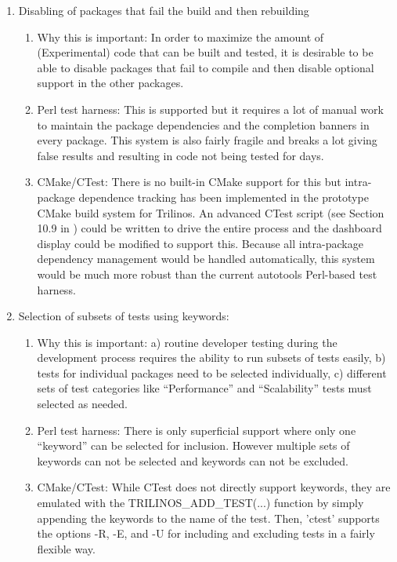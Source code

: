 \documentclass[pdf,ps2pdf,11pt]{SANDreport}
\begin{document}
\begin{enumerate}
{}\item Disabling of packages that fail the build and then rebuilding

  \begin{enumerate}

  {}\item Why this is important: In order to maximize the amount of
  (Experimental) code that can be built and tested, it is desirable
  to be able to disable packages that fail to compile and then
  disable optional support in the other packages.

  {}\item Perl test harness: This is supported but it requires a lot
  of manual work to maintain the package dependencies and the
  completion banners in every package.  This system is also fairly
  fragile and breaks a lot giving false results and resulting in code
  not being tested for days.

  {}\item CMake/CTest: There is no built-in CMake support for this but
  intra-package dependence tracking has been implemented in the
  prototype CMake build system for Trilinos.  An advanced CTest script
  (see Section 10.9 in {}\cite{MasteringCMake_fourth}) could be
  written to drive the entire process and the dashboard display could
  be modified to support this.  Because all intra-package dependency
  management would be handled automatically, this system would be much
  more robust than the current autotools Perl-based test harness.

  \end{enumerate}

{}\item Selection of subsets of tests using keywords:

  \begin{enumerate}

  {}\item Why this is important: a) routine developer testing during
  the development process requires the ability to run subsets of tests
  easily, b) tests for individual packages need to be selected
  individually, c) different sets of test categories like
  ``Performance'' and ``Scalability'' tests must selected as needed.

  {}\item Perl test harness: There is only superficial support where
  only one ``keyword'' can be selected for inclusion.  However
  multiple sets of keywords can not be selected and keywords can not
  be excluded.

  {}\item CMake/CTest: While CTest does not directly support keywords,
  they are emulated with the TRILINOS\_ADD\_TEST(...) function by
  simply appending the keywords to the name of the test.  Then,
  'ctest' supports the options -R, -E, and -U for including and
  excluding tests in a fairly flexible way.

  \end{enumerate}

\end{enumerate}
\end{document}
